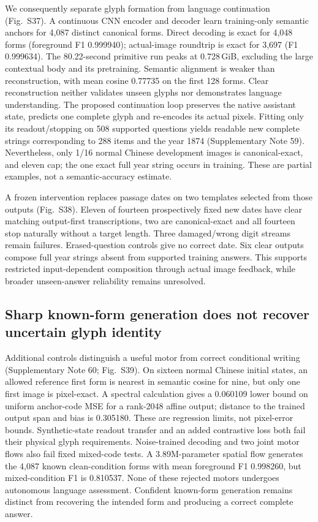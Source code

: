 \documentclass[12pt,a4paper]{article}
\begin{document}
We consequently separate glyph formation from language continuation
(Fig.~S37). A continuous CNN encoder and decoder learn training-only semantic
anchors for 4,087 distinct canonical forms. Direct decoding is exact for
4,048 forms (foreground F1 0.999940); actual-image roundtrip is exact for
3,697 (F1 0.999634). The 80.22-second primitive run peaks at 0.728\,GiB,
excluding the large contextual body and its pretraining. Semantic alignment
is weaker than reconstruction, with mean cosine 0.77735 on the first 128
forms. Clear reconstruction neither validates unseen glyphs nor demonstrates
language understanding. The proposed continuation loop preserves the native
assistant state, predicts one complete glyph and re-encodes its actual pixels.
Fitting only its readout/stopping on 508 supported questions yields readable
new complete strings corresponding to 288 items and the year 1874
(Supplementary Note 59). Nevertheless, only 1/16 normal Chinese development
images is canonical-exact, and eleven cap; the one exact full year string
occurs in training. These are partial examples, not a semantic-accuracy estimate.

A frozen intervention replaces passage dates on two templates selected from
those outputs (Fig.~S38). Eleven of fourteen prospectively fixed new dates
have clear matching output-first transcriptions, two are canonical-exact and
all fourteen stop naturally without a target length. Three damaged/wrong
digit streams remain failures. Erased-question controls give no correct date.
Six clear outputs compose full year strings absent from supported training
answers. This supports restricted input-dependent composition through actual
image feedback, while broader unseen-answer reliability remains unresolved.


\subsection*{Sharp known-form generation does not recover uncertain glyph identity}
Additional controls distinguish a useful motor from correct conditional
writing (Supplementary Note 60; Fig.~S39). On sixteen
normal Chinese initial states, an allowed reference first form is nearest
in semantic cosine for nine, but only one first image is pixel-exact.
A spectral calculation gives a 0.060109 lower bound on uniform anchor-code
MSE for a rank-2048 affine output; distance to the trained output span and
bias is 0.305180. These are regression limits, not pixel-error bounds.
Synthetic-state readout transfer and an added contrastive loss both fail
their physical glyph requirements. Noise-trained decoding and two joint
motor flows also fail fixed mixed-code tests. A 3.89M-parameter spatial
flow generates the 4,087 known clean-condition forms with mean foreground
F1 0.998260, but mixed-condition F1 is 0.810537. None of these rejected
motors undergoes autonomous language assessment. Confident known-form
generation remains distinct from recovering the intended form and producing
a correct complete answer.
\end{document}
